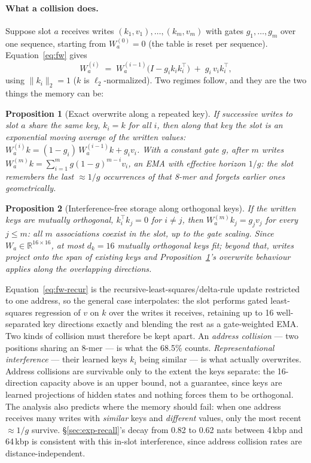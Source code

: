 \documentclass[11pt]{article}
\theoremstyle{plain}
\newtheorem{proposition}{Proposition}
\begin{document}
\paragraph{What a collision does.} Suppose slot $a$ receives writes $(k_1,v_1),\dots,(k_m,v_m)$
with gates $g_1,\dots,g_m$ over one sequence, starting from $W_a^{(0)}=0$ (the table is reset per
sequence). Equation~\ref{eq:fw} gives
\begin{equation}
W_a^{(i)} \;=\; W_a^{(i-1)}\bigl(I - g_i k_i k_i^{\top}\bigr) \;+\; g_i\,v_i k_i^{\top},
\label{eq:fw-recur}
\end{equation}
using $\|k_i\|_2 = 1$ ($k$ is $\ell_2$-normalized). Two regimes follow, and they are the two
things the memory can be:

\begin{proposition}[Exact overwrite along a repeated key]\label{prop:ema}
If successive writes to slot $a$ share the same key, $k_i = k$ for all $i$, then along that key
the slot is an exponential moving average of the written values:
$W_a^{(i)}k = (1-g_i)\,W_a^{(i-1)}k + g_i v_i$. With a constant gate $g$, after $m$ writes
$W_a^{(m)}k = \sum_{i=1}^{m}g(1-g)^{m-i}v_i$, an EMA with effective horizon $1/g$: the slot
remembers the last $\approx 1/g$ occurrences of that 8-mer and forgets earlier ones geometrically.
\end{proposition}

\begin{proposition}[Interference-free storage along orthogonal keys]\label{prop:rls}
If the written keys are mutually orthogonal, $k_i^{\top}k_j = 0$ for $i\neq j$, then
$W_a^{(m)}k_j = g_j v_j$ for every $j\le m$: all $m$ associations coexist in the slot, up to the
gate scaling. Since $W_a \in \mathbb{R}^{16\times16}$, at most $d_k = 16$ mutually orthogonal keys
fit; beyond that, writes project onto the span of existing keys and Proposition~\ref{prop:ema}'s
overwrite behaviour applies along the overlapping directions.
\end{proposition}

Equation~\ref{eq:fw-recur} is the recursive-least-squares/delta-rule update restricted to one
address, so the general case interpolates: the slot performs gated least-squares regression of
$v$ on $k$ over the writes it receives, retaining up to 16 well-separated key directions exactly
and blending the rest as a gate-weighted EMA. Two kinds of collision must therefore be kept apart. An \emph{address collision} --- two
positions sharing an 8-mer --- is what the 68.5\% counts. \emph{Representational interference}
--- their learned keys $k_i$ being similar --- is what actually overwrites. Address collisions
are survivable only to the extent the keys separate: the 16-direction capacity above is an upper
bound, not a guarantee, since keys are learned projections of hidden states and nothing forces
them to be orthogonal. The analysis also predicts where the memory should fail: when one address
receives many writes with \emph{similar} keys and \emph{different} values, only the most recent
$\approx 1/g$ survive. \S\ref{sec:exp-recall}'s decay from 0.82 to 0.62 nats between 4\,kbp and
64\,kbp is consistent with this in-slot interference, since address collision rates are
distance-independent.
\end{document}
